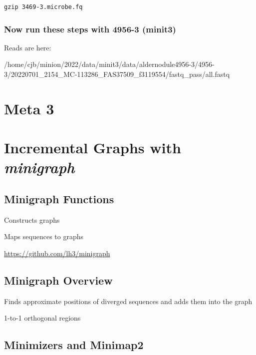 \documentclass[
]{book}
\begin{document}
\begin{verbatim}
gzip 3469-3.microbe.fq
\end{verbatim}

\hypertarget{now-run-these-steps-with-4956-3-minit3}{%
\subsection*{Now run these steps with 4956-3 (minit3)}\label{now-run-these-steps-with-4956-3-minit3}}

Reads are here:

/home/cjb/minion/2022/data/minit3/data/aldernodule4956-3/4956-3/20220701\_2154\_MC-113286\_FAS37509\_f3119554/fastq\_pass/all.fastq

\hypertarget{meta-3}{%
\chapter{Meta 3}\label{meta-3}}

\hypertarget{incremental-graphs-with-minigraph}{%
\chapter{\texorpdfstring{Incremental Graphs with \emph{minigraph}}{Incremental Graphs with minigraph}}\label{incremental-graphs-with-minigraph}}

\hypertarget{minigraph-functions}{%
\section{Minigraph Functions}\label{minigraph-functions}}

Constructs graphs

Maps sequences to graphs

\url{https://github.com/lh3/minigraph}

\hypertarget{minigraph-overview}{%
\section{Minigraph Overview}\label{minigraph-overview}}

Finds approximate positions of diverged sequences and adds them into the graph

1-to-1 orthogonal regions

\hypertarget{minimizers-and-minimap2}{%
\section{Minimizers and Minimap2}\label{minimizers-and-minimap2}}
\end{document}
